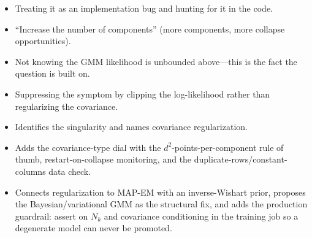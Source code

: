 \begin{interviewq}
\redflags
\begin{itemize}
    \item Treating it as an implementation bug and hunting for it in the code.
    \item ``Increase the number of components'' (more components, more collapse opportunities).
    \item Not knowing the GMM likelihood is unbounded above---this is the fact the question is built on.
    \item Suppressing the symptom by clipping the log-likelihood rather than regularizing the covariance.
\end{itemize}


\goodgreat
\begin{itemize}
    \item {} Identifies the singularity and names covariance regularization.
    \item {} Adds the covariance-type dial with the $d^2$-points-per-component rule of thumb, restart-on-collapse monitoring, and the duplicate-rows/constant-columns data check.
    \item {} Connects regularization to MAP-EM with an inverse-Wishart prior, proposes the Bayesian/variational GMM as the structural fix, and adds the production guardrail: assert on $N_k$ and covariance conditioning in the training job so a degenerate model can never be promoted.
\end{itemize}

\end{interviewq}

